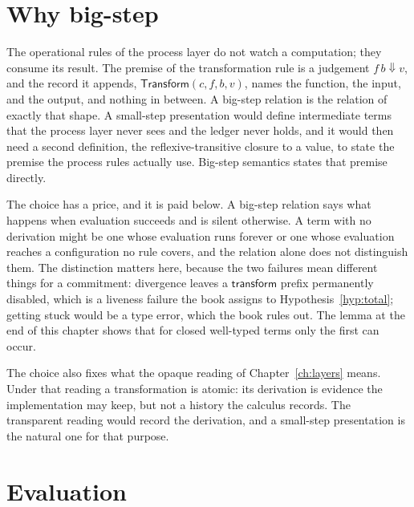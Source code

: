 \documentclass[11pt,openany]{book}
\theoremstyle{remark}
\newcommand{\Transform}{\mathsf{Transform}}
\begin{document}
\section{Why big-step}

The operational rules of the process layer do not watch a computation;
they consume its result. The premise of the transformation rule is a
judgement $f\,b\Downarrow v$, and the record it appends,
$\Transform(c,f,b,v)$, names the function, the input, and the output, and
nothing in between. A big-step relation is the relation of exactly that
shape. A small-step presentation would define intermediate terms that the
process layer never sees and the ledger never holds, and it would then
need a second definition, the reflexive-transitive closure to a value, to
state the premise the process rules actually use. Big-step semantics
states that premise directly.

The choice has a price, and it is paid below. A big-step relation says
what happens when evaluation succeeds and is silent otherwise. A term with
no derivation might be one whose evaluation runs forever or one whose
evaluation reaches a configuration no rule covers, and the relation alone
does not distinguish them. The distinction matters here, because the two
failures mean different things for a commitment: divergence leaves a
$\mathsf{transform}$ prefix permanently disabled, which is a liveness
failure the book assigns to Hypothesis~\ref{hyp:total}; getting stuck
would be a type error, which the book rules out. The lemma at the end of
this chapter shows that for closed well-typed terms only the first can
occur.

The choice also fixes what the opaque reading of Chapter~\ref{ch:layers}
means. Under that reading a transformation is atomic: its derivation is
evidence the implementation may keep, but not a history the calculus
records. The transparent reading would record the derivation, and a
small-step presentation is the natural one for that purpose.

\section{Evaluation}
\end{document}
